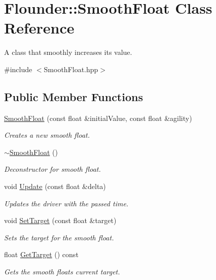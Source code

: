 \hypertarget{class_flounder_1_1_smooth_float}{}\section{Flounder\+:\+:Smooth\+Float Class Reference}
\label{class_flounder_1_1_smooth_float}


A class that smoothly increases its value.  




{\ttfamily \#include $<$Smooth\+Float.\+hpp$>$}

\subsection*{Public Member Functions}
\begin{DoxyCompactItemize}
\item 
\hyperlink{class_flounder_1_1_smooth_float_a84287dcb82c5c78d59421a3b2d6c9ec0}{Smooth\+Float} (const float \&initial\+Value, const float \&agility)
\begin{DoxyCompactList}\small\item\em Creates a new smooth float. \end{DoxyCompactList}\item 
\hyperlink{class_flounder_1_1_smooth_float_ad612a3199dc34ec2bc14744d1bb5c82c}{$\sim$\+Smooth\+Float} ()
\begin{DoxyCompactList}\small\item\em Deconstructor for smooth float. \end{DoxyCompactList}\item 
void \hyperlink{class_flounder_1_1_smooth_float_ad9524cd3d215767fa93451745fca471f}{Update} (const float \&delta)
\begin{DoxyCompactList}\small\item\em Updates the driver with the passed time. \end{DoxyCompactList}\item 
void \hyperlink{class_flounder_1_1_smooth_float_aa523d70b695e7e6d4713622b2cc3eacc}{Set\+Target} (const float \&target)
\begin{DoxyCompactList}\small\item\em Sets the target for the smooth float. \end{DoxyCompactList}\item 
float \hyperlink{class_flounder_1_1_smooth_float_a263c1f2fd667e6536ca9d2f920e0e585}{Get\+Target} () const
\begin{DoxyCompactList}\small\item\em Gets the smooth floats current target. \end{DoxyCompactList}\item 

\end{DoxyCompactItemize}
